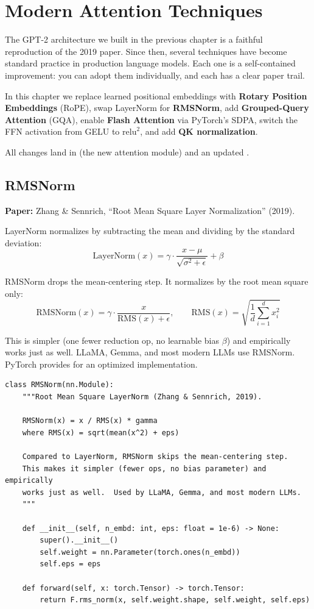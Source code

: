 \chapter{Modern Attention Techniques}
\label{ch:modern-attn}

The GPT-2 architecture we built in the previous chapter is a faithful reproduction of the 2019 paper.  Since then, several techniques have become standard practice in production language models.  Each one is a self-contained improvement: you can adopt them individually, and each has a clear paper trail.

In this chapter we replace learned positional embeddings with \textbf{Rotary Position Embeddings} (RoPE), swap LayerNorm for \textbf{RMSNorm}, add \textbf{Grouped-Query Attention} (GQA), enable \textbf{Flash Attention} via PyTorch's SDPA, switch the FFN activation from GELU to $\mathrm{relu}^2$, and add \textbf{QK normalization}.

All changes land in  (the new attention module) and an updated .


\section{RMSNorm}

\textbf{Paper:} Zhang \& Sennrich, ``Root Mean Square Layer Normalization'' (2019).

LayerNorm normalizes by subtracting the mean and dividing by the standard deviation:
\[
  \text{LayerNorm}(x) = \gamma \cdot \frac{x - \mu}{\sqrt{\sigma^2 + \epsilon}} + \beta
\]

RMSNorm drops the mean-centering step.  It normalizes by the root mean square only:
\[
  \text{RMSNorm}(x) = \gamma \cdot \frac{x}{\text{RMS}(x) + \epsilon}, \qquad
  \text{RMS}(x) = \sqrt{\frac{1}{d}\sum_{i=1}^{d} x_i^2}
\]

This is simpler (one fewer reduction op, no learnable bias $\beta$) and empirically works just as well.  LLaMA, Gemma, and most modern LLMs use RMSNorm.  PyTorch provides  for an optimized implementation.

\begin{lstlisting}
class RMSNorm(nn.Module):
    """Root Mean Square LayerNorm (Zhang & Sennrich, 2019).

    RMSNorm(x) = x / RMS(x) * gamma
    where RMS(x) = sqrt(mean(x^2) + eps)

    Compared to LayerNorm, RMSNorm skips the mean-centering step.
    This makes it simpler (fewer ops, no bias parameter) and empirically
    works just as well.  Used by LLaMA, Gemma, and most modern LLMs.
    """

    def __init__(self, n_embd: int, eps: float = 1e-6) -> None:
        super().__init__()
        self.weight = nn.Parameter(torch.ones(n_embd))
        self.eps = eps

    def forward(self, x: torch.Tensor) -> torch.Tensor:
        return F.rms_norm(x, self.weight.shape, self.weight, self.eps)
\end{lstlisting}


